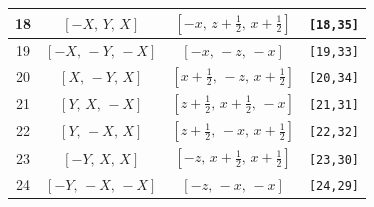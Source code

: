 \documentclass[fleqn,8pt]{jsarticle}
\begin{document}
\begin{longtable}{cccc}
18 & $\left[ - X,\, Y,\, X \right]$ & $\left[ - x,\, z + \frac{1}{2},\, x + \frac{1}{2} \right]$ & {\tt [18,35]} \\ \hline
19 & $\left[ - X,\, - Y,\, - X \right]$ & $\left[ - x,\, - z,\, - x \right]$ & {\tt [19,33]} \\ \hline
20 & $\left[ X,\, - Y,\, X \right]$ & $\left[ x + \frac{1}{2},\, - z,\, x + \frac{1}{2} \right]$ & {\tt [20,34]} \\ \hline
21 & $\left[ Y,\, X,\, - X \right]$ & $\left[ z + \frac{1}{2},\, x + \frac{1}{2},\, - x \right]$ & {\tt [21,31]} \\ \hline
22 & $\left[ Y,\, - X,\, X \right]$ & $\left[ z + \frac{1}{2},\, - x,\, x + \frac{1}{2} \right]$ & {\tt [22,32]} \\ \hline
23 & $\left[ - Y,\, X,\, X \right]$ & $\left[ - z,\, x + \frac{1}{2},\, x + \frac{1}{2} \right]$ & {\tt [23,30]} \\ \hline
24 & $\left[ - Y,\, - X,\, - X \right]$ & $\left[ - z,\, - x,\, - x \right]$ & {\tt [24,29]} \\
\end{longtable}
\renewcommand{\arraystretch}{1.2}
\end{document}
